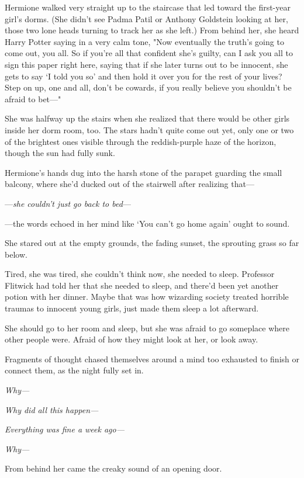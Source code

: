 Hermione walked very straight up to the staircase that led toward the
first-year girl's dorms. (She didn't see Padma Patil or Anthony Goldstein
looking at her, those two lone heads turning to track her as she left.) From
behind her, she heard Harry Potter saying in a very calm tone, "Now eventually
the truth's going to come out, you all. So if you're all that confident she's
guilty, can I ask you all to sign this paper right here, saying that if she
later turns out to be innocent, she gets to say `I told you so' and then hold
it over you for the rest of your lives? Step on up, one and all, don't be
cowards, if you really believe you shouldn't be afraid to bet\mbox{---}"

She was halfway up the stairs when she realized that there would be other girls
inside her dorm room, too.
\sbreak
The stars hadn't quite come out yet, only one or two of the brightest ones
visible through the reddish-purple haze of the horizon, though the sun had
fully sunk.

Hermione's hands dug into the harsh stone of the parapet guarding the small
balcony, where she'd ducked out of the stairwell after realizing that---

---\emph{she couldn't just go back to bed}---

---the words echoed in her mind like `You can't go home again' ought to sound.

She stared out at the empty grounds, the fading sunset, the sprouting grass so
far below.

Tired, she was tired, she couldn't think now, she needed to sleep. Professor
Flitwick had told her that she needed to sleep, and there'd been yet another
potion with her dinner. Maybe that was how wizarding society treated horrible
traumas to innocent young girls, just made them sleep a lot afterward.

She should go to her room and sleep, but she was afraid to go someplace where
other people were. Afraid of how they might look at her, or look away.

Fragments of thought chased themselves around a mind too exhausted to finish or
connect them, as the night fully set in.

\emph{Why---}

\emph{Why did all this happen---}

\emph{Everything was fine a week ago---}

\emph{Why---}

From behind her came the creaky sound of an opening door.

